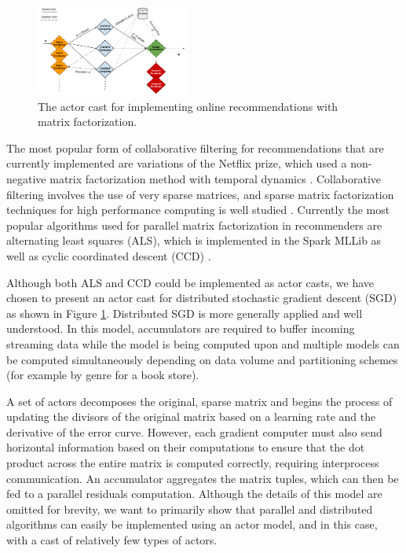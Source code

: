 \documentclass[conference,twocolumn,10pt]{IEEEtran}
\begin{document}
\begin{figure}[!t]
    \centering
    \includegraphics[width=0.45\textwidth]{nnmf_cast}
    \caption{The actor cast for implementing online recommendations with matrix factorization.}
    \label{fig:nnmf_cast}
\end{figure}

The most popular form of collaborative filtering for recommendations that are currently implemented are variations of the Netflix prize, which used a non-negative matrix factorization method with temporal dynamics \cite{koren_collaborative_2010}. Collaborative filtering involves the use of very sparse matrices, and sparse matrix factorization techniques for high performance computing is well studied \cite{gupta_highly_1997}. Currently the most popular algorithms used for parallel matrix factorization in recommenders are alternating least squares (ALS), which is implemented in the Spark MLLib as well as cyclic coordinated descent (CCD) \cite{yu_scalable_2012}.

Although both ALS and CCD could be implemented as actor casts, we have chosen to present an actor cast for distributed stochastic gradient descent (SGD) \cite{gemulla_large-scale_2011} as shown in Figure \ref{fig:nnmf_cast}. Distributed SGD is more generally applied and well understood. In this model, accumulators are required to buffer incoming streaming data while the model is being computed upon and multiple models can be computed simultaneously depending on data volume and partitioning schemes (for example by genre for a book store).

A set of actors decomposes the original, sparse matrix and begins the process of updating the divisors of the original matrix based on a learning rate and the derivative of the error curve. However, each gradient computer must also send horizontal information based on their computations to ensure that the dot product across the entire matrix is computed correctly, requiring interprocess communication. An accumulator aggregates the matrix tuples, which can then be fed to a parallel residuals computation. Although the details of this model are omitted for brevity, we want to primarily show that parallel and distributed algorithms can easily be implemented using an actor model, and in this case, with a cast of relatively few types of actors.
\end{document}
